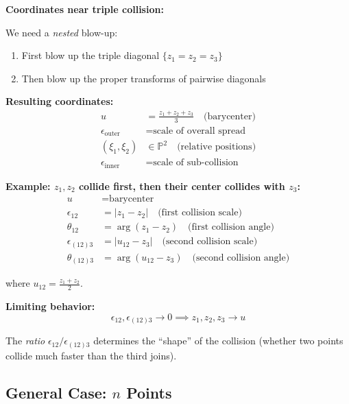 \begin{example}
\textbf{Coordinates near triple collision:}

We need a \emph{nested} blow-up:
\begin{enumerate}
\item First blow up the triple diagonal $\{z_1 = z_2 = z_3\}$
\item Then blow up the proper transforms of pairwise diagonals
\end{enumerate}

\textbf{Resulting coordinates:}
\begin{align}
u &= \frac{z_1 + z_2 + z_3}{3} \quad \text{(barycenter)}\\
\epsilon_{\text{outer}} &= \text{scale of overall spread}\\
(\xi_1, \xi_2) &\in \mathbb{P}^2 \quad \text{(relative positions)}\\
\epsilon_{\text{inner}} &= \text{scale of sub-collision}
\end{align}

\textbf{Example: $z_1, z_2$ collide first, then their center collides with $z_3$:}
\begin{align}
u &= \text{barycenter}\\
\epsilon_{12} &= |z_1 - z_2| \quad \text{(first collision scale)}\\
\theta_{12} &= \arg(z_1 - z_2) \quad \text{(first collision angle)}\\
\epsilon_{(12)3} &= |u_{12} - z_3| \quad \text{(second collision scale)}\\
\theta_{(12)3} &= \arg(u_{12} - z_3) \quad \text{(second collision angle)}
\end{align}

where $u_{12} = \frac{z_1 + z_2}{2}$.

\textbf{Limiting behavior:}
$$\epsilon_{12}, \epsilon_{(12)3} \to 0 \implies z_1, z_2, z_3 \to u$$

The \emph{ratio} $\epsilon_{12} / \epsilon_{(12)3}$ determines the ``shape'' of the
collision (whether two points collide much faster than the third joins).
\end{example}

\subsection{General Case: $n$ Points}

